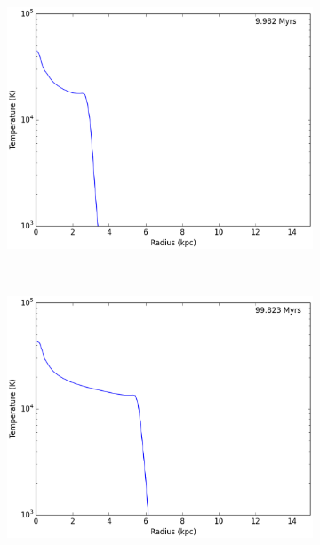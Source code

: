 \begin{figure}
        \centering
        \begin{subfigure}[b]{0.3\textwidth}
                \includegraphics[width=\textwidth]{graphics/ifrontThermal6400020Tempprofile.eps}
                \label{fig:stromgrenthermal10}
        \end{subfigure}
        ~ 
        \begin{subfigure}[b]{0.3\textwidth}
                \includegraphics[width=\textwidth]{graphics/ifrontThermal6400200Tempprofile.eps}
                \label{fig:stromgrenthermal100}
        \end{subfigure}

\end{figure}
